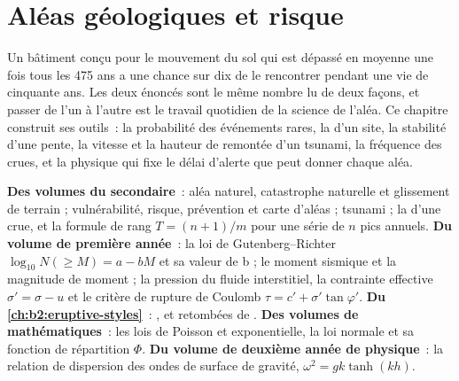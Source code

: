 \chapter{Aléas géologiques et risque}\label{ch:b2:geological-hazards}

Un bâtiment conçu pour le mouvement du sol qui est dépassé en moyenne une fois tous les 475 ans
a une chance sur dix de le rencontrer pendant une vie de cinquante ans. Les deux énoncés sont le
même nombre lu de deux façons, et passer de l'un à l'autre est le travail quotidien de la science
de l'aléa. Ce chapitre construit ses outils~: la probabilité des événements rares, la  d'un site, la stabilité d'une pente, la vitesse et la hauteur de remontée d'un tsunami,
la fréquence des crues, et la physique qui fixe le délai d'alerte que peut donner chaque aléa.

\begin{recall}
\textbf{Des volumes du secondaire}~: aléa naturel, catastrophe naturelle et glissement de terrain ;
vulnérabilité, risque, prévention et carte d'aléas ; tsunami ; la  d'une crue, et
la formule de rang $T = (n + 1)/m$ pour une série de $n$ pics annuels. \textbf{Du volume de première
année}~: la loi de Gutenberg--Richter $\log_{10} N(\geq M) = a - bM$ et sa valeur de b ; le moment
sismique et la magnitude de moment ; la pression du fluide interstitiel, la contrainte effective
$\sigma' = \sigma - u$ et le critère de rupture de Coulomb $\tau = c' + \sigma' \tan\varphi'$.
\textbf{Du \cref{ch:b2:eruptive-styles}}~: ,  et retombées
de . \textbf{Des volumes de mathématiques}~: les lois de Poisson et exponentielle, la
loi normale et sa fonction de répartition $\Phi$. \textbf{Du volume de deuxième année de
physique}~: la relation de dispersion des ondes de surface de gravité, $\omega^2 = gk\tanh(kh)$.
\end{recall}

